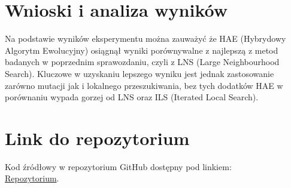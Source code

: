 \documentclass[11pt]{article}
\begin{document}
\section{Wnioski i analiza wyników}\label{sec:wnioski}

Na podstawie wyników eksperymentu można zauważyć że HAE (Hybrydowy Algorytm Ewolucyjny)
osiągnął wyniki porównywalne z najlepszą z metod badanych w poprzednim sprawozdaniu, czyli z LNS (Large Neighbourhood Search).
Kluczowe w uzyskaniu lepszego wyniku jest jednak zastosowanie zarówno mutacji jak i lokalnego przeszukiwania,
bez tych dodatków HAE w porównaniu wypada gorzej od LNS oraz ILS (Iterated Local Search).


\section{Link do repozytorium}\label{sec:link-do-repo}
Kod źródłowy w repozytorium GitHub dostępny pod linkiem: \\
\href{https://github.com/KotZPolibudy/PUT_IMO/tree/main/Lab5%20-%20Ewolucyjny}{Repozytorium}.
\end{document}
